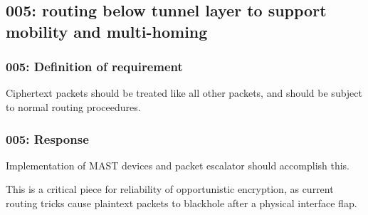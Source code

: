 \subsection{005: routing below tunnel layer to support mobility and multi-homing}

\label{req005}

\subsubsection{005: Definition of requirement }

Ciphertext packets should be treated like all other packets, and should be
subject to normal routing proceedures.

\subsubsection{005: Response}

Implementation of MAST devices and packet escalator should accomplish this.

This is a critical piece for reliability of opportunistic encryption, as
current routing tricks cause plaintext packets to blackhole after a physical
interface flap.


